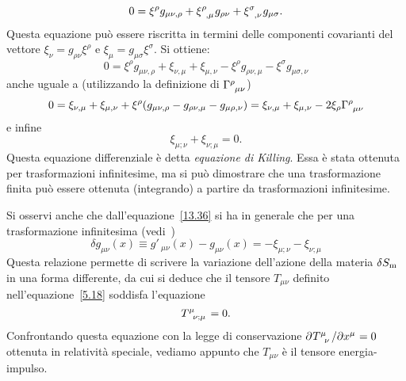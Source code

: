 \begin{equation}
  0 = \xi^{\rho} g_{\mu \nu ,\rho} + \tensor{\xi}{^{\rho}_{,\mu}} g_{\rho \nu} +
  \tensor{\xi}{^{\sigma}_{,\nu}} g_{\mu \sigma}.
\end{equation}
Questa equazione può essere riscritta in termini delle componenti covarianti del
vettore $\xi_{\nu} = g_{\rho \nu} \xi^{\rho}$ e $\xi_{\mu} = g_{\mu \sigma}
\xi^{\sigma}$.  Si ottiene:
\begin{equation}
  0 = \xi^{\rho} g_{\mu \nu ,\rho}
  +   \xi_{\nu,\mu} + \xi_{\mu,\nu}
  - \xi^{\rho} g_{\rho \nu,\mu} - \xi^{\sigma} g_{\mu \sigma,\nu}
\end{equation}
anche uguale a (utilizzando la definizione di $\tensor{\Gamma}{^{\rho}_{\mu
    \nu}}$)
\begin{equation}
  0 =   \xi_{\nu,\mu} + \xi_{\mu,\nu}
  + \xi^{\rho} (g_{\mu \nu,\rho}
  -             g_{\rho \nu,\mu} - g_{\mu \rho,\nu})
  =   \xi_{\nu,\mu} + \xi_{\mu,\nu} -2 \xi_{\rho} \tensor{\Gamma}{^{\rho}_{\mu
      \nu}}
\end{equation}
e infine
\begin{equation}
  \label{W13.1.5}
  \xi_{\mu;\nu}+\xi_{\nu;\mu} =0.
\end{equation}
Questa equazione differenziale è detta \emph{equazione di Killing}.  Essa è
stata ottenuta per trasformazioni infinitesime, ma si può dimostrare che una
trasformazione finita può essere ottenuta (integrando) a partire da
trasformazioni infinitesime.

Si osservi anche che dall'equazione~\eqref{13.36} si ha in generale che per una
trasformazione infinitesima (vedi~\textcite[355]{landau:campi})
\begin{equation}
  \delta g_{\mu \nu}(x) \equiv g'_{\ \mu \nu}(x) - g_{\mu \nu}(x) =
  -\xi_{\mu;\nu}-\xi_{\nu;\mu}
\label{L94.3}
\end{equation}
Questa relazione permette di scrivere la variazione dell'azione della materia
$\delta S_{\textup{m}}$ in una forma differente, da cui si deduce che il tensore
$T_{\mu \nu}$ definito nell'equazione~\eqref{5.18} soddisfa l'equazione
\begin{equation}
  \tensor{T}{^{\mu}_{\nu ; \mu}} = 0.
\end{equation}
Confrontando questa equazione con la legge di conservazione
$\lparder{\tensor{T}{^{\mu}_{\nu}}}{x^{\mu}}=0$ ottenuta in relatività speciale,
vediamo appunto che $T_{\mu \nu}$ è il tensore energia-impulso.

